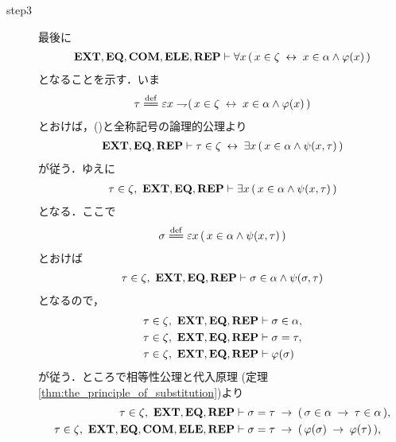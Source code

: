 \begin{sketch}
\begin{description}
			\item[step3]
				最後に
				\begin{align}
					\mbox{{\bf EXT}},\mbox{{\bf EQ}},\mbox{\bf COM},\mbox{{\bf ELE}},\mbox{{\bf REP}} \vdash \forall x\,
					(\, x \in \zeta \hspace{0.25em}\leftrightarrow\hspace{0.25em} x \in \alpha \wedge \varphi(x)\, )
					\label{fom:thm_axiom_of_separation_8}
				\end{align}
				となることを示す．いま
				\begin{align}
					\tau \defeq \varepsilon x \negation
					(\, x \in \zeta \lrarrow x \in \alpha \wedge \varphi(x)\, )
				\end{align}
				とおけば，()と全称記号の論理的公理より
				\begin{align}
					\mbox{{\bf EXT}},\mbox{{\bf EQ}},\mbox{{\bf REP}} \vdash 
					\tau \in \zeta \hspace{0.25em}\leftrightarrow\hspace{0.25em} \exists x\, (\, x \in \alpha \wedge 
					\psi(x,\tau)\, )
					\label{fom:thm_axiom_of_separation_5}
				\end{align}
				が従う．ゆえに
				\begin{align}
					\tau \in \zeta,\ \mbox{{\bf EXT}},\mbox{{\bf EQ}},\mbox{{\bf REP}} \vdash
					\exists x\, (\, x \in \alpha \wedge \psi(x,\tau)\, )
				\end{align}
				となる．ここで
				\begin{align}
					\sigma \defeq \varepsilon x\, (\, x \in \alpha \wedge
					\psi(x,\tau)\, )
				\end{align}
				とおけば
				\begin{align}
					\tau \in \zeta,\ \mbox{{\bf EXT}},\mbox{{\bf EQ}},\mbox{{\bf REP}} \vdash
					\sigma \in \alpha \wedge \psi(\sigma,\tau)
				\end{align}
				となるので，
				\begin{align}
					\tau \in \zeta,\ \mbox{{\bf EXT}},\mbox{{\bf EQ}},\mbox{{\bf REP}} &\vdash \sigma \in \alpha, \\
					\tau \in \zeta,\ \mbox{{\bf EXT}},\mbox{{\bf EQ}},\mbox{{\bf REP}} &\vdash \sigma = \tau, \\
					\tau \in \zeta,\ \mbox{{\bf EXT}},\mbox{{\bf EQ}},\mbox{{\bf REP}} &\vdash \varphi(\sigma)
				\end{align}
				が従う．ところで相等性公理と代入原理
				(定理\ref{thm:the_principle_of_substitution})より
				\begin{align}
					\tau \in \zeta,\ \EXTAX,\EQAX,\REPAX &\vdash 
						\sigma = \tau \rarrow (\, \sigma \in \alpha \rarrow
						\tau \in \alpha\, ), \\
					\tau \in \zeta,\ \EXTAX,\EQAX,\COMAX,\ELEAX,\REPAX &\vdash
						\sigma = \tau \rarrow (\, \varphi(\sigma) \rarrow
						\varphi(\tau)\, ), 
						\label{fom:thm_axiom_of_separation_9} \\

\end{align}
\end{description}
\end{sketch}
